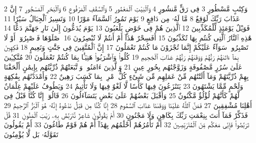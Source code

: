 {\tiny\colorbox{cl_aya}{2}} وَكِتَٰبٍ مَّسْطُورٍ
{\tiny\colorbox{cl_aya}{3}} فِى رَقٍّ مَّنشُورٍ
{\tiny\colorbox{cl_aya}{4}} وَٱلْبَيْتِ ٱلْمَعْمُورِ
{\tiny\colorbox{cl_aya}{5}} وَٱلسَّقْفِ ٱلْمَرْفُوعِ
{\tiny\colorbox{cl_aya}{6}} وَٱلْبَحْرِ ٱلْمَسْجُورِ
{\tiny\colorbox{cl_aya}{7}} إِنَّ عَذَابَ رَبِّكَ لَوَٰقِعٌ
{\tiny\colorbox{cl_aya}{8}} مَّا لَهُۥ مِن دَافِعٍ
{\tiny\colorbox{cl_aya}{9}} يَوْمَ تَمُورُ ٱلسَّمَآءُ مَوْرًا
{\tiny\colorbox{cl_aya}{10}} وَتَسِيرُ ٱلْجِبَالُ سَيْرًا
{\tiny\colorbox{cl_aya}{11}} فَوَيْلٌ يَوْمَئِذٍ لِّلْمُكَذِّبِينَ
{\tiny\colorbox{cl_aya}{12}} ٱلَّذِينَ هُمْ فِى خَوْضٍ يَلْعَبُونَ
{\tiny\colorbox{cl_aya}{13}} يَوْمَ يُدَعُّونَ إِلَىٰ نَارِ جَهَنَّمَ دَعًّا
{\tiny\colorbox{cl_aya}{14}} هَٰذِهِ ٱلنَّارُ ٱلَّتِى كُنتُم بِهَا تُكَذِّبُونَ
{\tiny\colorbox{cl_aya}{15}} أَفَسِحْرٌ هَٰذَآ أَمْ أَنتُمْ لَا تُبْصِرُونَ
{\tiny\colorbox{cl_aya}{16}} ٱصْلَوْهَا فَٱصْبِرُوٓا۟ أَوْ لَا تَصْبِرُوا۟ سَوَآءٌ عَلَيْكُمْ إِنَّمَا تُجْزَوْنَ مَا كُنتُمْ تَعْمَلُونَ
{\tiny\colorbox{cl_aya}{17}} إِنَّ ٱلْمُتَّقِينَ فِى جَنَّٰتٍ وَنَعِيمٍ
{\tiny\colorbox{cl_aya}{18}} فَٰكِهِينَ بِمَآ ءَاتَىٰهُمْ رَبُّهُمْ وَوَقَىٰهُمْ رَبُّهُمْ عَذَابَ ٱلْجَحِيمِ
{\tiny\colorbox{cl_aya}{19}} كُلُوا۟ وَٱشْرَبُوا۟ هَنِيٓـًٔۢا بِمَا كُنتُمْ تَعْمَلُونَ
{\tiny\colorbox{cl_aya}{20}} مُتَّكِـِٔينَ عَلَىٰ سُرُرٍ مَّصْفُوفَةٍ وَزَوَّجْنَٰهُم بِحُورٍ عِينٍ
{\tiny\colorbox{cl_aya}{21}} وَٱلَّذِينَ ءَامَنُوا۟ وَٱتَّبَعَتْهُمْ ذُرِّيَّتُهُم بِإِيمَٰنٍ أَلْحَقْنَا بِهِمْ ذُرِّيَّتَهُمْ وَمَآ أَلَتْنَٰهُم مِّنْ عَمَلِهِم مِّن شَىْءٍ كُلُّ ٱمْرِئٍۭ بِمَا كَسَبَ رَهِينٌ
{\tiny\colorbox{cl_aya}{22}} وَأَمْدَدْنَٰهُم بِفَٰكِهَةٍ وَلَحْمٍ مِّمَّا يَشْتَهُونَ
{\tiny\colorbox{cl_aya}{23}} يَتَنَٰزَعُونَ فِيهَا كَأْسًا لَّا لَغْوٌ فِيهَا وَلَا تَأْثِيمٌ
{\tiny\colorbox{cl_aya}{24}} وَيَطُوفُ عَلَيْهِمْ غِلْمَانٌ لَّهُمْ كَأَنَّهُمْ لُؤْلُؤٌ مَّكْنُونٌ
{\tiny\colorbox{cl_aya}{25}} وَأَقْبَلَ بَعْضُهُمْ عَلَىٰ بَعْضٍ يَتَسَآءَلُونَ
{\tiny\colorbox{cl_aya}{26}} قَالُوٓا۟ إِنَّا كُنَّا قَبْلُ فِىٓ أَهْلِنَا مُشْفِقِينَ
{\tiny\colorbox{cl_aya}{27}} فَمَنَّ ٱللَّهُ عَلَيْنَا وَوَقَىٰنَا عَذَابَ ٱلسَّمُومِ
{\tiny\colorbox{cl_aya}{28}} إِنَّا كُنَّا مِن قَبْلُ نَدْعُوهُ إِنَّهُۥ هُوَ ٱلْبَرُّ ٱلرَّحِيمُ
{\tiny\colorbox{cl_aya}{29}} فَذَكِّرْ فَمَآ أَنتَ بِنِعْمَتِ رَبِّكَ بِكَاهِنٍ وَلَا مَجْنُونٍ
{\tiny\colorbox{cl_aya}{30}} أَمْ يَقُولُونَ شَاعِرٌ نَّتَرَبَّصُ بِهِۦ رَيْبَ ٱلْمَنُونِ
{\tiny\colorbox{cl_aya}{31}} قُلْ تَرَبَّصُوا۟ فَإِنِّى مَعَكُم مِّنَ ٱلْمُتَرَبِّصِينَ
{\tiny\colorbox{cl_aya}{32}} أَمْ تَأْمُرُهُمْ أَحْلَٰمُهُم بِهَٰذَآ أَمْ هُمْ قَوْمٌ طَاغُونَ
{\tiny\colorbox{cl_aya}{33}} أَمْ يَقُولُونَ تَقَوَّلَهُۥ بَل لَّا يُؤْمِنُونَ
